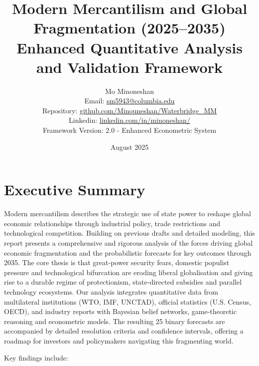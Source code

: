 \documentclass[12pt]{article}
\title{Modern Mercantilism and Global Fragmentation (2025--2035)\\Enhanced Quantitative Analysis and Validation Framework}
\author{Mo Minoneshan\\
\small Email: \href{mailto:sm5943@columbia.edu}{sm5943@columbia.edu}\\
\small Repository: \url{github.com/Minouneshan/Waterbridge_MM}\\
\small Linkedin: \url{linkedin.com/in/minoneshan/}\\
\small Framework Version: 2.0 - Enhanced Econometric System
}
\date{August 2025}
\begin{document}
\maketitle

\tableofcontents

\clearpage

\section{Executive Summary}

Modern mercantilism describes the strategic use of state power to reshape global economic relationships through industrial policy, trade restrictions and technological competition.  Building on previous drafts and detailed modeling, this report presents a comprehensive and rigorous analysis of the forces driving global economic fragmentation and the probabilistic forecasts for key outcomes through 2035.  The core thesis is that great‑power security fears, domestic populist pressure and technological bifurcation are eroding liberal globalisation and giving rise to a durable regime of protectionism, state‑directed subsidies and parallel technology ecosystems.  Our analysis integrates quantitative data from multilateral institutions (WTO, IMF, UNCTAD), official statistics (U.S. Census, OECD), and industry reports with Bayesian belief networks, game‑theoretic reasoning and econometric models.  The resulting 25 binary forecasts are accompanied by detailed resolution criteria and confidence intervals, offering a roadmap for investors and policymakers navigating this fragmenting world.

Key findings include:
\end{document}
